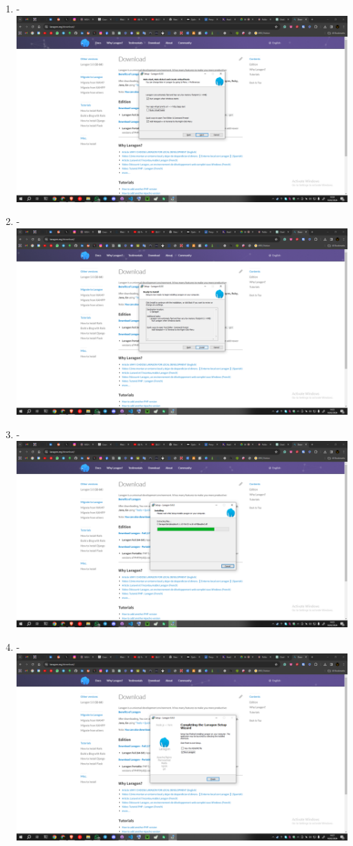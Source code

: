 \documentclass[12pt,titlepage]{article}
\begin{document}
\begin{enumerate}[label= \alph*.]
    \newpage
    \item - \\ \includegraphics[width=.9\textwidth]{images/figures/Laragon 5.png}
    \item - \\ \includegraphics[width=.9\textwidth]{images/figures/Laragon 6.png}
    \newpage
    \item - \\ \includegraphics[width=.9\textwidth]{images/figures/Laragon 7.png}
    \item - \\ \includegraphics[width=.9\textwidth]{images/figures/Laragon 8.png}

\end{enumerate}
\end{document}
